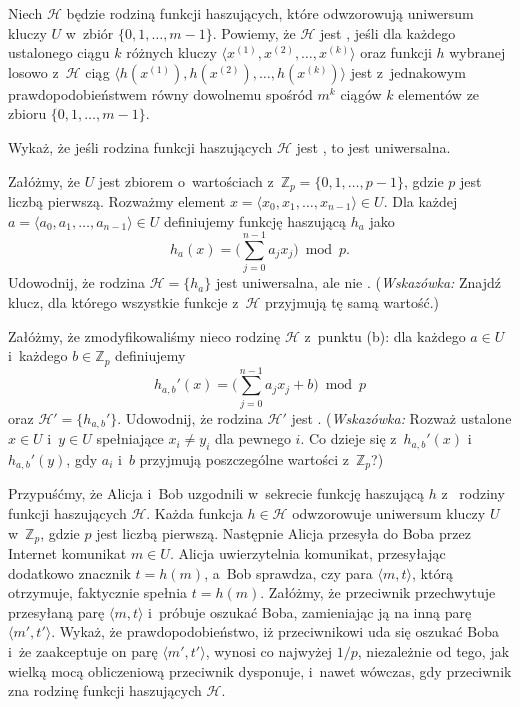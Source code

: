 \noindent Niech $\mathcal{H}$ będzie rodziną funkcji haszujących, które odwzorowują uniwersum kluczy $U$ w~zbiór $\{0,1,\dots,m-1\}$.
Powiemy, że $\mathcal{H}$ jest \textbf{}, jeśli dla każdego ustalonego ciągu $k$ różnych kluczy $\langle x^{(1)},x^{(2)},\dots,x^{(k)}\rangle$ oraz funkcji $h$ wybranej losowo z~$\mathcal{H}$ ciąg $\langle h(x^{(1)}),h(x^{(2)}),\dots,h(x^{(k)})\rangle$ jest z~jednakowym prawdopodobieństwem równy dowolnemu spośród $m^k$ ciągów $k$ elementów ze zbioru $\{0,1,\dots,m-1\}$.
\begin{description}
	\setlength{}
	\item[{\sffamily\bfseries(a)}] Wykaż, że jeśli rodzina funkcji haszujących $\mathcal{H}$ jest , to jest uniwersalna.
	\item[{\sffamily\bfseries(b)}] Załóżmy, że $U$ jest zbiorem  o~wartościach z~$\mathbb{Z}_p=\{0,1,\dots,p-1\}$, gdzie $p$ jest liczbą pierwszą.
Rozważmy element $x=\langle x_0,x_1,\dots,x_{n-1}\rangle\in U$.
Dla każdej  $a=\langle a_0,a_1,\dots,a_{n-1}\rangle\in U$ definiujemy funkcję haszującą $h_a$ jako
	\[
		h_a(x) = \biggl(\sum_{j=0}^{n-1}a_jx_j\biggr)\bmod p.
	\]
	Udowodnij, że rodzina $\mathcal{H}=\{h_a\}$ jest uniwersalna, ale nie .
(\!\emph{Wskazówka:} Znajdź klucz, dla którego wszystkie funkcje z~$\mathcal{H}$ przyjmują tę samą wartość.)
	\item[{\sffamily\bfseries(c)}] Załóżmy, że zmodyfikowaliśmy nieco rodzinę $\mathcal{H}$ z~punktu (b): dla każdego $a\in U$ i~każdego $b\in\mathbb{Z}_p$ definiujemy
	\[
		h_{a,b}'(x) = \biggl(\sum_{j=0}^{n-1}a_jx_j+b\biggr)\bmod p
	\]
	oraz $\mathcal{H}'=\{h_{a,b}'\}$.
Udowodnij, że rodzina $\mathcal{H}'$ jest .
(\!\emph{Wskazówka:} Rozważ ustalone $x\in U$ i~$y\in U$ spełniające $x_i\ne y_i$ dla pewnego $i$.
Co dzieje się z~$h_{a,b}'(x)$ i~$h_{a,b}'(y)$, gdy $a_i$ i~$b$ przyjmują poszczególne wartości z~$\mathbb{Z}_p$?)
	\item[{\sffamily\bfseries(d)}] Przypuśćmy, że Alicja i~Bob uzgodnili w~sekrecie funkcję haszującą $h$ z~ rodziny funkcji haszujących $\mathcal{H}$.
Każda funkcja $h\in\mathcal{H}$ odwzorowuje uniwersum kluczy $U$ w~$\mathbb{Z}_p$, gdzie $p$ jest liczbą pierwszą.
Następnie Alicja przesyła do Boba przez Internet komunikat $m\in U$.
Alicja uwierzytelnia komunikat, przesyłając dodatkowo znacznik $t=h(m)$, a~Bob sprawdza, czy para $\langle m,t\rangle$, którą otrzymuje, faktycznie spełnia $t=h(m)$.
Załóżmy, że przeciwnik przechwytuje przesyłaną parę $\langle m,t\rangle$ i~próbuje oszukać Boba, zamieniając ją na inną parę $\langle m',t'\rangle$.
Wykaż, że prawdopodobieństwo, iż przeciwnikowi uda się oszukać Boba i~że zaakceptuje on parę $\langle m',t'\rangle$, wynosi co najwyżej $1/p$, niezależnie od tego, jak wielką mocą obliczeniową przeciwnik dysponuje, i~nawet wówczas, gdy przeciwnik zna rodzinę funkcji haszujących $\mathcal{H}$.
\end{description}

